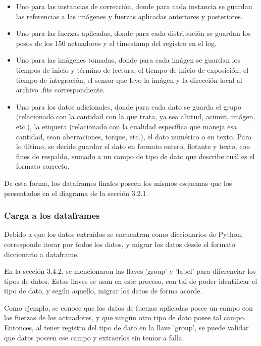 \begin{itemize}

    \item Uno para las instancias de corrección, donde para cada instancia se guardan las referencias a las imágenes y fuerzas aplicadas anteriores y posteriores.

    \item Uno para las fuerzas aplicadas, donde para cada distribución se guardan los pesos de los 150 actuadores y el timestamp del registro en el log.

    \item Uno para las imágenes tomadas, donde para cada imágen se guardan los tiempos de inicio y término de lectura, el tiempo de inicio de exposición, el tiempo de integración, el sensor que leyo la imágen y la dirección local al archivo .fits correspondiente.

    \item Uno para los datos adicionales, donde para cada dato se guarda el grupo (relacionado con la cantidad con la que trata, ya sea altitud, acimut, imágen, etc.), la etiqueta (relacionado con la cualidad específica que maneja esa cantidad, sean aberraciones, torque, etc.), el dato numérico o en texto. Para lo último, se decide guardar el dato en formato entero, flotante y texto, con fines de respaldo, sumado a un campo de tipo de dato que describe cuál es el formato correcto.
    
\end{itemize}

De esta forma, los dataframes finales poseen los mismos esquemas que los presentados en el diagrama de la sección 3.2.1.

\subsubsection{Carga a los dataframes}

Debido a que los datos extraídos se encuentran como diccionarios de Python, corresponde iterar por todos los datos, y migrar los datos desde el formato diccionario a dataframe.

En la sección 3.4.2. se mencionaron las llaves 'group' y 'label' para diferenciar los tipos de datos. Estas llaves se usan en este proceso, con tal de poder identificar el tipo de dato, y según aquello, migrar los datos de forma acorde.

Como ejemplo, se conoce que los datos de fuerzas aplicadas posee un campo con las fuerzas de los actuadores, y que ningún otro tipo de dato posee tal campo. Entonces, al tener registro del tipo de dato en la llave 'group', se puede validar que datos poseen ese campo y extraerlos sin temor a falla.

